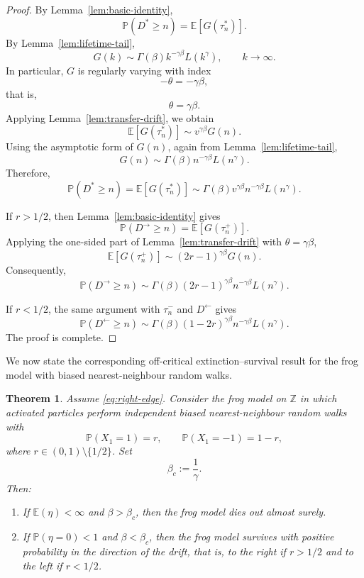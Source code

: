 \documentclass[reqno,final,11pt]{amsart}
\newcommand{\E}{\mathbb E}
\newcommand{\Pbb}{\mathbb P}
\theoremstyle{plain}
\newtheorem{theorem}{Theorem}[section]
\theoremstyle{definition}
\theoremstyle{remark}
\numberwithin{equation}{section}
\begin{document}
\begin{proof}
By Lemma~\ref{lem:basic-identity},
\[
  \Pbb(D^*\ge n)=\E[G(\tau_n^*)].
\]
By Lemma~\ref{lem:lifetime-tail},
\[
  G(k)
  \sim
  \Gamma(\beta)k^{-\gamma\beta}L(k^\gamma),
  \qquad k\to\infty.
\]
In particular, \(G\) is regularly varying with index
\[
  -\theta=-\gamma\beta,
\]
that is,
\[
  \theta=\gamma\beta.
\]
Applying Lemma~\ref{lem:transfer-drift}, we obtain
\[
  \E[G(\tau_n^*)]
  \sim
  v^{\gamma\beta}G(n).
\]
Using the asymptotic form of \(G(n)\), again from
Lemma~\ref{lem:lifetime-tail},
\[
  G(n)
  \sim
  \Gamma(\beta)n^{-\gamma\beta}L(n^\gamma).
\]
Therefore,
\[
  \Pbb(D^*\ge n)
  =
  \E[G(\tau_n^*)]
  \sim
  \Gamma(\beta)v^{\gamma\beta}
  n^{-\gamma\beta}L(n^\gamma).
\]

If \(r>1/2\), then Lemma~\ref{lem:basic-identity} gives
\[
  \Pbb(D^\to\ge n)=\E[G(\tau_n^+)].
\]
Applying the one-sided part of Lemma~\ref{lem:transfer-drift} with
\(\theta=\gamma\beta\),
\[
  \E[G(\tau_n^+)]
  \sim
  (2r-1)^{\gamma\beta}G(n).
\]
Consequently,
\[
  \Pbb(D^\to\ge n)
  \sim
  \Gamma(\beta)(2r-1)^{\gamma\beta}
  n^{-\gamma\beta}L(n^\gamma).
\]

If \(r<1/2\), the same argument with \(\tau_n^-\) and \(D^\leftarrow\) gives
\[
  \Pbb(D^\leftarrow\ge n)
  \sim
  \Gamma(\beta)(1-2r)^{\gamma\beta}
  n^{-\gamma\beta}L(n^\gamma).
\]
The proof is complete.
\end{proof}

We now state the corresponding off-critical extinction--survival result for the frog model with biased nearest-neighbour random walks.

\begin{theorem}\label{thm:drift-weibull-frog}
Assume \eqref{eq:right-edge}. Consider the frog model on \(\mathbb Z\) in which activated particles perform
independent biased nearest-neighbour random walks with
\[
  \Pbb(X_1=1)=r,
  \qquad
  \Pbb(X_1=-1)=1-r,
\]
where \(r\in(0,1)\setminus\{1/2\}\). Set
\[
  \beta_c:=\frac1\gamma.
\]
Then:
\begin{enumerate}[label=\textup{(\roman*)}]
\item If \(\E(\eta)<\infty\) and \(\beta>\beta_c\), then the frog model dies
out almost surely.
\item If \(\Pbb(\eta=0)<1\) and \(\beta<\beta_c\), then the frog model survives
with positive probability in the direction of the drift, that is, to the right
if \(r>1/2\) and to the left if \(r<1/2\).
\end{enumerate}
\end{theorem}
\end{document}

